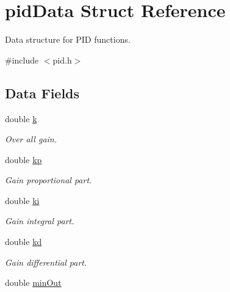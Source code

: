 \hypertarget{structpid_data}{\section{pid\-Data \-Struct \-Reference}
\label{structpid_data}
}


\-Data structure for \-P\-I\-D functions.  




{\ttfamily \#include $<$pid.\-h$>$}

\subsection*{\-Data \-Fields}
\begin{DoxyCompactItemize}
\item 
\hypertarget{structpid_data_adc468c70fb574ebd07287b38d0d0676d}{double \hyperlink{structpid_data_adc468c70fb574ebd07287b38d0d0676d}{k}}\label{structpid_data_adc468c70fb574ebd07287b38d0d0676d}

\begin{DoxyCompactList}\small\item\em \-Over all gain. \end{DoxyCompactList}\item 
\hypertarget{structpid_data_a72044a36b6c9a9a7c8381c2df90d1ae7}{double \hyperlink{structpid_data_a72044a36b6c9a9a7c8381c2df90d1ae7}{kp}}\label{structpid_data_a72044a36b6c9a9a7c8381c2df90d1ae7}

\begin{DoxyCompactList}\small\item\em \-Gain proportional part. \end{DoxyCompactList}\item 
\hypertarget{structpid_data_a0d61130a6dd5eea85c2c5facfe1c15a7}{double \hyperlink{structpid_data_a0d61130a6dd5eea85c2c5facfe1c15a7}{ki}}\label{structpid_data_a0d61130a6dd5eea85c2c5facfe1c15a7}

\begin{DoxyCompactList}\small\item\em \-Gain integral part. \end{DoxyCompactList}\item 
\hypertarget{structpid_data_abd3df139a836391b1e0b2931edf9bb4b}{double \hyperlink{structpid_data_abd3df139a836391b1e0b2931edf9bb4b}{kd}}\label{structpid_data_abd3df139a836391b1e0b2931edf9bb4b}

\begin{DoxyCompactList}\small\item\em \-Gain differential part. \end{DoxyCompactList}\item 
\hypertarget{structpid_data_a63b4fa4621b3b415456f63052a37c85f}{double \hyperlink{structpid_data_a63b4fa4621b3b415456f63052a37c85f}{min\-Out}}\label{structpid_data_a63b4fa4621b3b415456f63052a37c85f}


\end{DoxyCompactItemize}

